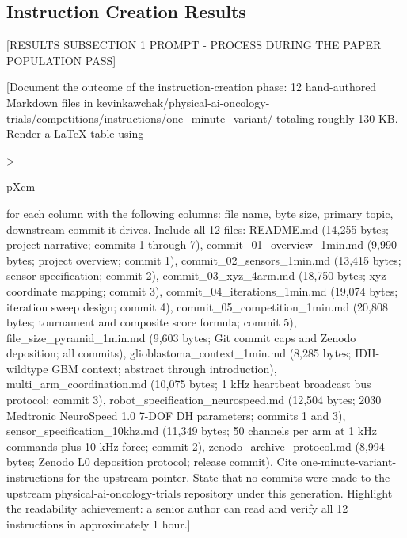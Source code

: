 
\subsection{Instruction Creation Results}
\label{sec:results-instructions}

[RESULTS SUBSECTION 1 PROMPT - PROCESS DURING THE PAPER POPULATION PASS]

[Document the outcome of the instruction-creation phase: 12
hand-authored Markdown files in
kevinkawchak/physical-ai-oncology-trials/competitions/instructions/one_minute_variant/
totaling roughly 130 KB. Render a LaTeX table using
{>{\raggedright\arraybackslash}p{Xcm}} for each column with the
following columns: file name, byte size, primary topic, downstream
commit it drives. Include all 12 files: README.md (14,255 bytes;
project narrative; commits 1 through 7), commit_01_overview_1min.md
(9,990 bytes; project overview; commit 1), commit_02_sensors_1min.md
(13,415 bytes; sensor specification; commit 2),
commit_03_xyz_4arm.md (18,750 bytes; xyz coordinate mapping; commit 3),
commit_04_iterations_1min.md (19,074 bytes; iteration sweep design;
commit 4), commit_05_competition_1min.md (20,808 bytes; tournament
and composite score formula; commit 5), file_size_pyramid_1min.md
(9,603 bytes; Git commit caps and Zenodo deposition; all commits),
glioblastoma_context_1min.md (8,285 bytes; IDH-wildtype GBM context;
abstract through introduction), multi_arm_coordination.md
(10,075 bytes; 1 kHz heartbeat broadcast bus protocol; commit 3),
robot_specification_neurospeed.md (12,504 bytes; 2030 Medtronic
NeuroSpeed 1.0 7-DOF DH parameters; commits 1 and 3),
sensor_specification_10khz.md (11,349 bytes; 50 channels per arm at
1 kHz commands plus 10 kHz force; commit 2),
zenodo_archive_protocol.md (8,994 bytes; Zenodo L0 deposition
protocol; release commit). Cite one-minute-variant-instructions for
the upstream pointer. State that no commits were made to the
upstream physical-ai-oncology-trials repository under this
generation. Highlight the readability achievement: a senior author
can read and verify all 12 instructions in approximately 1 hour.]

